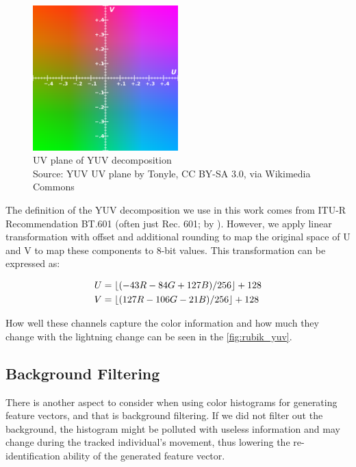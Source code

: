 \begin{figure}
    \centering
    \includegraphics[width=5.6cm]{img/YUV_UV_plane.svg.png}
    \caption[UV plane of YUV decomposition]{UV plane of YUV decomposition\\
    Source: YUV UV plane\protect\footnotemark{} by Tonyle, CC BY-SA 3.0, via Wikimedia Commons \protect\footnotemark{}}
    \label{fig:yuv_decomposition}
\end{figure}
\addtocounter{footnote}{-2}

The definition of the YUV decomposition we use in this work comes from ITU-R Recommendation BT.601
(often just Rec. 601; by \cite{bt2011studio}). However, we apply linear
transformation with offset and additional rounding to map the original space of U and V
to map these components to 8-bit values. This transformation can be expressed
as:

\begin{align*}
U &= \lfloor(-43R - 84G + 127B) / 256\rfloor + 128 \\
V &= \lfloor(127R - 106G - 21B) / 256\rfloor + 128
\end{align*}

How well these channels capture the color information and how much they change with the lightning change can be seen in the \autoref{fig:rubik_yuv}.

\subsection{Background Filtering}

There is another aspect to consider when using color histograms for generating feature vectors, and that is background filtering. If we did not filter out the background, the histogram might be polluted with useless information and may change during the tracked individual's movement, thus lowering the re-identification ability of the generated feature vector.


